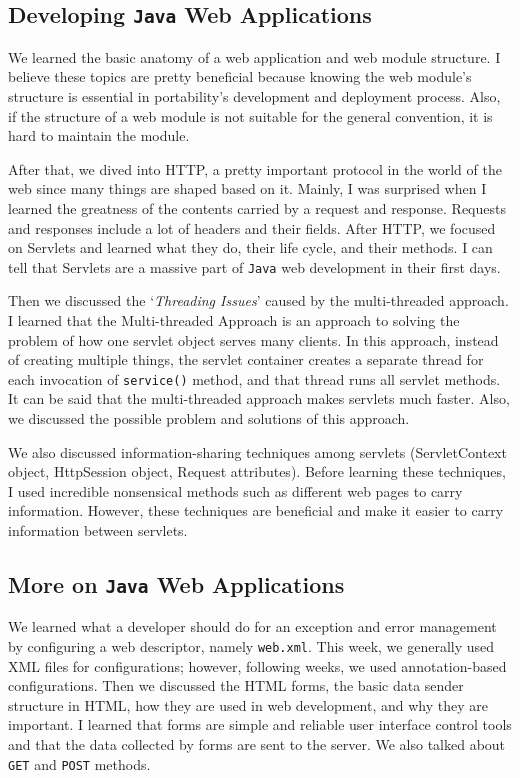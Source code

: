 \subsection{Developing \texttt{Java} Web Applications}

We learned the basic anatomy of a web application and web module structure. I believe these topics are pretty beneficial because knowing the web module's structure is essential in portability's development and deployment process. Also, if the structure of a web module is not suitable for the general convention, it is hard to maintain the module.

After that, we dived into HTTP, a pretty important protocol in the world of the web since many things are shaped based on it. Mainly, I was surprised when I learned the greatness of the contents carried by a request and response. Requests and responses include a lot of headers and their fields. After HTTP, we focused on Servlets and learned what they do, their life cycle, and their methods. I can tell that Servlets are a massive part of \texttt{Java} web development in their first days. 

Then we discussed the `\textit{Threading Issues}' caused by the multi-threaded approach. I learned that the Multi-threaded Approach is an approach to solving the problem of how one servlet object serves many clients. In this approach, instead of creating multiple things, the servlet container creates a separate thread for each invocation of \texttt{service()} method, and that thread runs all servlet methods. It can be said that the multi-threaded approach makes servlets much faster. Also, we discussed the possible problem and solutions of this approach.

We also discussed information-sharing techniques among servlets (ServletContext object, HttpSession object, Request attributes). Before learning these techniques, I used incredible nonsensical methods such as different web pages to carry information. However, these techniques are beneficial and make it easier to carry information between servlets.

\subsection{More on \texttt{Java} Web Applications}

We learned what a developer should do for an exception and error management by configuring a web descriptor, namely \texttt{web.xml}. This week, we generally used XML files for configurations; however, following weeks, we used annotation-based configurations. Then we discussed the HTML forms, the basic data sender structure in HTML, how they are used in web development, and why they are important. I learned that forms are simple and reliable user interface control tools and that the data collected by forms are sent to the server. We also talked about \texttt{GET} and \texttt{POST} methods.

